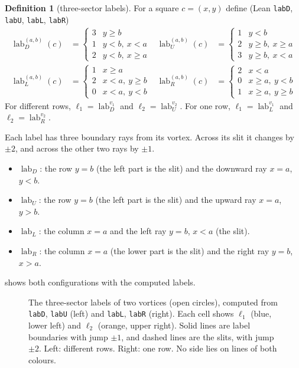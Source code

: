\documentclass[11pt]{article}
\theoremstyle{plain}
\theoremstyle{definition}
\newtheorem{definition}[theorem]{Definition}
\theoremstyle{remark}
\newcommand{\lean}[1]{\texttt{#1}}
\newcommand{\lab}{\operatorname{lab}}
\begin{document}
\begin{definition}[three-sector labels]
For a square $c=(x,y)$ define (Lean \lean{labD}, \lean{labU}, \lean{labL}, \lean{labR})
\begin{align*}
\lab_D^{(a,b)}(c)&=\begin{cases}3&y\ge b\\1&y<b,\ x<a\\2&y<b,\ x\ge a\end{cases}&
\lab_U^{(a,b)}(c)&=\begin{cases}1&y<b\\2&y\ge b,\ x\ge a\\3&y\ge b,\ x<a\end{cases}\\
\lab_L^{(a,b)}(c)&=\begin{cases}1&x\ge a\\2&x<a,\ y\ge b\\0&x<a,\ y<b\end{cases}&
\lab_R^{(a,b)}(c)&=\begin{cases}2&x<a\\0&x\ge a,\ y<b\\1&x\ge a,\ y\ge b\end{cases}
\end{align*}
For different rows, $\ell_1=\lab_D^{v_1}$ and $\ell_2=\lab_U^{v_2}$.
For one row, $\ell_1=\lab_L^{v_1}$ and $\ell_2=\lab_R^{v_2}$.
\end{definition}

Each label has three boundary rays from its vortex.
Across its slit it changes by $\pm2$, and across the other two rays by $\pm1$.
\begin{itemize}
\item $\lab_D$: the row $y=b$ (the left part is the slit) and the downward ray $x=a$, $y<b$.
\item $\lab_U$: the row $y=b$ (the left part is the slit) and the upward ray $x=a$, $y>b$.
\item $\lab_L$: the column $x=a$ and the left ray $y=b$, $x<a$ (the slit).
\item $\lab_R$: the column $x=a$ (the lower part is the slit) and the right ray $y=b$, $x>a$.
\end{itemize}
 shows both configurations with the computed labels.

\begin{figure}[t]
\centering

\caption{The three-sector labels of two vortices (open circles), computed from \lean{labD},
\lean{labU} (left) and \lean{labL}, \lean{labR} (right).
Each cell shows $\ell_1$ (blue, lower left) and $\ell_2$ (orange, upper right).
Solid lines are label boundaries with jump $\pm1$, and dashed lines are the slits, with jump
$\pm2$.
Left: different rows.
Right: one row.
No side lies on lines of both colours.}
\label{fig:twovortex}
\end{figure}
\end{document}
